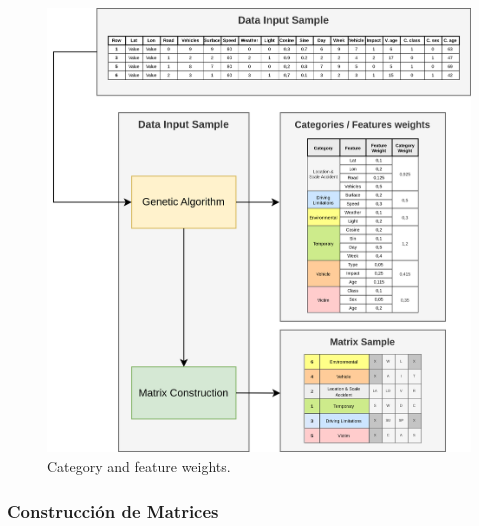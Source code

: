 \documentclass{uathesis-es}
\begin{document}
{	\begin{figure}[H]
		\centering
		\includegraphics[width=14cm]{Figures/Postprocessing_2.png}
		\caption{Category and feature weights.}
		\label{PostprocessingStage}
	\end{figure}
	
	\subsubsection{Construcción de Matrices}
	
}
\end{document}
